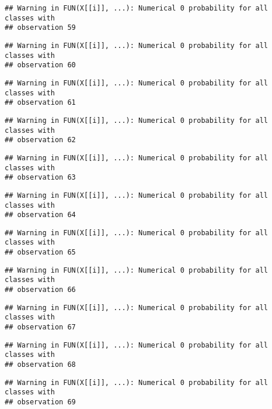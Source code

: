 \documentclass[
]{article}
\begin{document}
\begin{verbatim}
## Warning in FUN(X[[i]], ...): Numerical 0 probability for all classes with
## observation 59
\end{verbatim}

\begin{verbatim}
## Warning in FUN(X[[i]], ...): Numerical 0 probability for all classes with
## observation 60
\end{verbatim}

\begin{verbatim}
## Warning in FUN(X[[i]], ...): Numerical 0 probability for all classes with
## observation 61
\end{verbatim}

\begin{verbatim}
## Warning in FUN(X[[i]], ...): Numerical 0 probability for all classes with
## observation 62
\end{verbatim}

\begin{verbatim}
## Warning in FUN(X[[i]], ...): Numerical 0 probability for all classes with
## observation 63
\end{verbatim}

\begin{verbatim}
## Warning in FUN(X[[i]], ...): Numerical 0 probability for all classes with
## observation 64
\end{verbatim}

\begin{verbatim}
## Warning in FUN(X[[i]], ...): Numerical 0 probability for all classes with
## observation 65
\end{verbatim}

\begin{verbatim}
## Warning in FUN(X[[i]], ...): Numerical 0 probability for all classes with
## observation 66
\end{verbatim}

\begin{verbatim}
## Warning in FUN(X[[i]], ...): Numerical 0 probability for all classes with
## observation 67
\end{verbatim}

\begin{verbatim}
## Warning in FUN(X[[i]], ...): Numerical 0 probability for all classes with
## observation 68
\end{verbatim}

\begin{verbatim}
## Warning in FUN(X[[i]], ...): Numerical 0 probability for all classes with
## observation 69
\end{verbatim}
\end{document}
